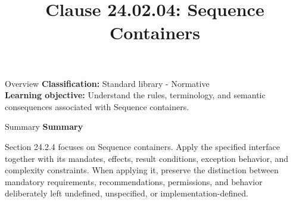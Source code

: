\documentclass[10pt,letterpaper]{article}
\title{Clause 24.02.04: Sequence Containers}
\author{}
\date{}
\begin{document}
\maketitle
\begin{CornellOverviewBox}{Overview}
\textbf{Classification:} Standard library - Normative\\[2pt]
\textbf{Learning objective:} Understand the rules, terminology, and semantic consequences associated with Sequence containers.
\end{CornellOverviewBox}\begin{CornellSummaryBox}{Summary}
{\sffamily\bfseries\color{Accent} Summary}\par\vspace{3pt}Section 24.2.4 focuses on Sequence containers. Apply the specified interface together with its mandates, effects, result conditions, exception behavior, and complexity constraints. When applying it, preserve the distinction between mandatory requirements, recommendations, permissions, and behavior deliberately left undefined, unspecified, or implementation-defined.
\end{CornellSummaryBox}
\end{document}
